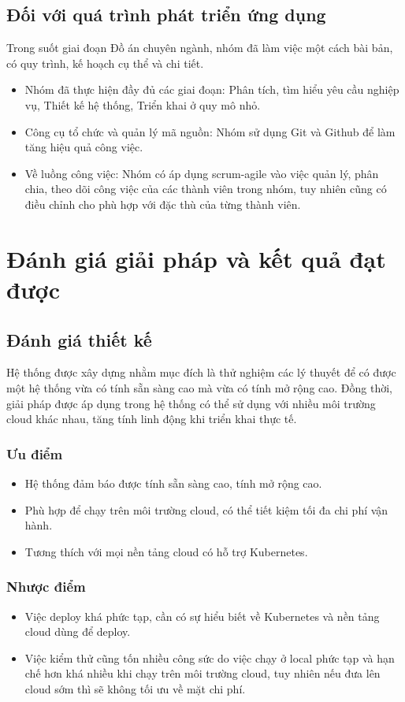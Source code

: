 \subsection{Đối với quá trình phát triển ứng dụng}
\noindent Trong suốt giai đoạn Đồ án chuyên ngành, nhóm đã làm việc một cách bài bản, có quy trình, kế hoạch cụ thể và chi tiết.
\begin{itemize}
    \item Nhóm đã thực hiện đầy đủ các giai đoạn: Phân tích, tìm hiểu yêu cầu nghiệp vụ, Thiết kế hệ thống, Triển khai ở quy mô nhỏ.
    \item Công cụ tổ chức và quản lý mã nguồn: Nhóm sử dụng Git và Github để làm tăng hiệu quả công việc.
    \item Về luồng công việc: Nhóm có áp dụng scrum-agile vào việc quản lý, phân chia, theo dõi công việc của các thành viên trong nhóm, tuy nhiên cũng có điều chỉnh cho phù hợp với đặc thù của từng thành viên.
\end{itemize}
\section{Đánh giá giải pháp và kết quả đạt được}
\subsection{Đánh giá thiết kế}
\noindent Hệ thống được xây dựng nhằm mục đích là thử nghiệm các lý thuyết để có được một hệ thống vừa có tính sẵn sàng cao mà vừa có tính mở rộng cao. Đồng thời, giải pháp được áp dụng trong hệ thống có thể sử dụng với nhiều môi trường cloud khác nhau, tăng tính linh động khi triển khai thực tế.
\subsubsection{Ưu điểm}
\begin{itemize}
    \item Hệ thống đảm báo được tính sẵn sàng cao, tính mở rộng cao.
    \item Phù hợp để chạy trên môi trường cloud, có thể tiết kiệm tối đa chi phí vận hành.
    \item Tương thích với mọi nền tảng cloud có hỗ trợ Kubernetes.
\end{itemize}
\subsubsection{Nhược điểm}
\begin{itemize}
    \item Việc deploy khá phức tạp, cần có sự hiểu biết về Kubernetes và nền tảng cloud dùng để deploy.
    \item Việc kiểm thử cũng tốn nhiều công sức do việc chạy ở local phức tạp và hạn chế hơn khá nhiều khi chạy trên môi trường cloud, tuy nhiên nếu đưa lên cloud sớm thì sẽ không tối ưu về mặt chi phí.
\end{itemize}
